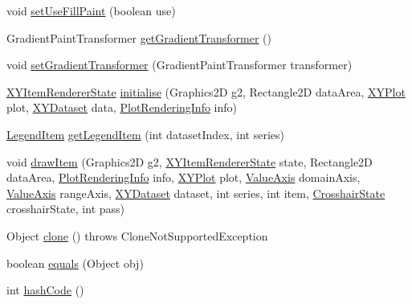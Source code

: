 \begin{DoxyCompactItemize}
\item 
void \mbox{\hyperlink{classorg_1_1jfree_1_1chart_1_1renderer_1_1xy_1_1_x_y_area_renderer_a603c02d3902bb665ff165a9281c130bc}{set\+Use\+Fill\+Paint}} (boolean use)
\item 
Gradient\+Paint\+Transformer \mbox{\hyperlink{classorg_1_1jfree_1_1chart_1_1renderer_1_1xy_1_1_x_y_area_renderer_a443e628932403853bc0ead2bf5669546}{get\+Gradient\+Transformer}} ()
\item 
void \mbox{\hyperlink{classorg_1_1jfree_1_1chart_1_1renderer_1_1xy_1_1_x_y_area_renderer_a37f754b20916387c639251cf4383533e}{set\+Gradient\+Transformer}} (Gradient\+Paint\+Transformer transformer)
\item 
\mbox{\hyperlink{classorg_1_1jfree_1_1chart_1_1renderer_1_1xy_1_1_x_y_item_renderer_state}{X\+Y\+Item\+Renderer\+State}} \mbox{\hyperlink{classorg_1_1jfree_1_1chart_1_1renderer_1_1xy_1_1_x_y_area_renderer_a19c88977e56183859dc5e3f06881a104}{initialise}} (Graphics2D g2, Rectangle2D data\+Area, \mbox{\hyperlink{classorg_1_1jfree_1_1chart_1_1plot_1_1_x_y_plot}{X\+Y\+Plot}} plot, \mbox{\hyperlink{interfaceorg_1_1jfree_1_1data_1_1xy_1_1_x_y_dataset}{X\+Y\+Dataset}} data, \mbox{\hyperlink{classorg_1_1jfree_1_1chart_1_1plot_1_1_plot_rendering_info}{Plot\+Rendering\+Info}} info)
\item 
\mbox{\hyperlink{classorg_1_1jfree_1_1chart_1_1_legend_item}{Legend\+Item}} \mbox{\hyperlink{classorg_1_1jfree_1_1chart_1_1renderer_1_1xy_1_1_x_y_area_renderer_a58ce45e99c097cedef59ac5c12bb1e78}{get\+Legend\+Item}} (int dataset\+Index, int series)
\item 
void \mbox{\hyperlink{classorg_1_1jfree_1_1chart_1_1renderer_1_1xy_1_1_x_y_area_renderer_aeb2341f860de5cfeec32e3955bf95667}{draw\+Item}} (Graphics2D g2, \mbox{\hyperlink{classorg_1_1jfree_1_1chart_1_1renderer_1_1xy_1_1_x_y_item_renderer_state}{X\+Y\+Item\+Renderer\+State}} state, Rectangle2D data\+Area, \mbox{\hyperlink{classorg_1_1jfree_1_1chart_1_1plot_1_1_plot_rendering_info}{Plot\+Rendering\+Info}} info, \mbox{\hyperlink{classorg_1_1jfree_1_1chart_1_1plot_1_1_x_y_plot}{X\+Y\+Plot}} plot, \mbox{\hyperlink{classorg_1_1jfree_1_1chart_1_1axis_1_1_value_axis}{Value\+Axis}} domain\+Axis, \mbox{\hyperlink{classorg_1_1jfree_1_1chart_1_1axis_1_1_value_axis}{Value\+Axis}} range\+Axis, \mbox{\hyperlink{interfaceorg_1_1jfree_1_1data_1_1xy_1_1_x_y_dataset}{X\+Y\+Dataset}} dataset, int series, int item, \mbox{\hyperlink{classorg_1_1jfree_1_1chart_1_1plot_1_1_crosshair_state}{Crosshair\+State}} crosshair\+State, int pass)
\item 
Object \mbox{\hyperlink{classorg_1_1jfree_1_1chart_1_1renderer_1_1xy_1_1_x_y_area_renderer_ab800677c4f9dca7132093b642d824f42}{clone}} ()  throws Clone\+Not\+Supported\+Exception 
\item 
boolean \mbox{\hyperlink{classorg_1_1jfree_1_1chart_1_1renderer_1_1xy_1_1_x_y_area_renderer_ae99ec95f254c39b78c6bb85b4991aa71}{equals}} (Object obj)
\item 
int \mbox{\hyperlink{classorg_1_1jfree_1_1chart_1_1renderer_1_1xy_1_1_x_y_area_renderer_a3d1d498e84dd3c243f31bf300d5eb81b}{hash\+Code}} ()
\end{DoxyCompactItemize}
